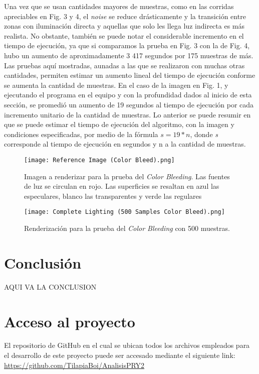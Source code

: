 \documentclass[conference]{IEEEtran}
\begin{document}
Una vez que se usan cantidades mayores de muestras, como en las corridas apreciables en Fig. 3 y 4, el \textit{noise} se reduce drásticamente y la transición entre zonas con iluminación directa y aquellas que solo les llega luz indirecta es más realista. No obstante, también se puede notar el considerable incremento en el tiempo de ejecución, ya que si comparamos la prueba en Fig. 3 con la de Fig. 4, hubo un aumento de aproximadamente 3 417 segundos por 175 muestras de más. Las pruebas aquí mostradas, aunadas a las que se realizaron con muchas otras cantidades, permiten estimar un aumento lineal del tiempo de ejecución conforme se aumenta la cantidad de muestras. En el caso de la imagen en Fig. 1, y ejecutando el programa en el equipo y con la profundidad dados al inicio de esta sección, se promedió un aumento de 19 segundos al tiempo de ejecución por cada incremento unitario de la cantidad de muestras. Lo anterior se puede resumir en que se puede estimar el tiempo de ejecución del algoritmo, con la imagen y condiciones especificadas,  por medio de la fórmula \(s = 19 * n\), donde \textit{s} corresponde al tiempo de ejecución en segundos y n a la cantidad de muestras. 



\begin{figure}[htbp]
\centerline{\texttt{[image: Reference Image (Color Bleed).png]}}
\caption{Imagen a renderizar para la prueba del \textit{Color Bleeding}. Las fuentes de luz se circulan en rojo. Las superficies se resaltan en azul las especulares, blanco las transparentes y verde las regulares}
\label{Imagen de referencia color bleeding}
\end{figure}

\begin{figure}[htbp]
\centerline{\texttt{[image: Complete Lighting (500 Samples Color Bleed).png]}}
\caption{Renderización para la prueba del \textit{Color Bleeding} con 500 muestras.}
\label{500 muestras color bleeding.}
\end{figure}
\section{Conclusión}

AQUI VA LA CONCLUSION

\section{Acceso al proyecto}
El repositorio de GitHub en el cual se ubican todos los archivos empleados para el desarrollo de este proyecto puede ser accesado mediante el siguiente link: \url{https://github.com/TilapiaBoi/AnalisisPRY2}
\end{document}
